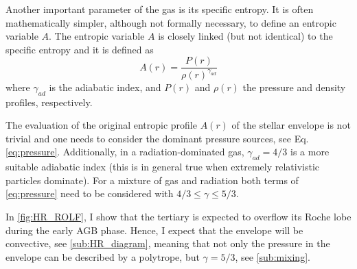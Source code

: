 Another important parameter of the gas is its specific entropy. It is often mathematically simpler, although not formally necessary, to define an entropic variable $A$. The entropic variable $A$ is closely linked (but not identical) to the specific entropy and it is defined as
\begin{equation}\label{eq:entropic_variable}
    A(r) = \frac{P(r)}{\rho(r)^{\gamma_{ad}}}
\end{equation}
where $\gamma_{ad}$ is the adiabatic index, and $P(r)$ and $\rho(r)$ the pressure and density profiles, respectively. 

The evaluation of the original entropic profile $A(r)$ of the stellar envelope is not trivial and one needs to consider the dominant pressure sources, see Eq. \eqref{eq:pressure}. Additionally, in a radiation-dominated gas, $\gamma_{ad} = 4/3$ is a more suitable adiabatic index (this is in general true when extremely relativistic particles dominate). For a mixture of gas and radiation both terms of \cref{eq:pressure} need to be considered with $4/3 \leq \gamma \leq 5/3$.

In \cref{fig:HR_ROLF}, I show that the tertiary is expected to overflow its Roche lobe during the early AGB phase. Hence, I expect that the envelope will be convective, see \cref{sub:HR_diagram}, meaning that not only the pressure in the envelope can be described by a polytrope, but $\gamma=5/3$, see \cref{sub:mixing}.

